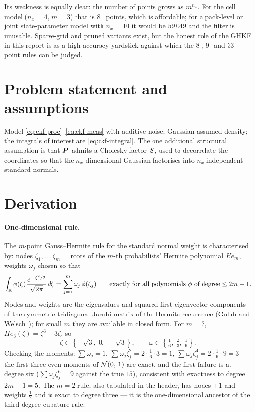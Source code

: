Its weakness is equally clear: the number of points grows as $m^{n_x}$. For the cell model
($n_x = 4$, $m = 3$) that is $81$ points, which is affordable; for a pack-level or
joint state-parameter model with $n_x = 10$ it would be $59\,049$ and the filter is unusable.
Sparse-grid and pruned variants exist, but the honest role of the GHKF in this report is as a
high-accuracy yardstick against which the $8$-, $9$- and $33$-point rules can be judged.

\section{Problem statement and assumptions}
Model \eqref{eq:ekf-proc}--\eqref{eq:ekf-meas} with additive noise; Gaussian assumed density;
the integrals of interest are \eqref{eq:ckf-integral}. The one additional structural
assumption is that $\bm{P}$ admits a Cholesky factor $\bm{S}$, used to decorrelate the coordinates
so that the $n_x$-dimensional Gaussian factorises into $n_x$ independent standard normals.

\section{Derivation}
\paragraph{One-dimensional rule.} The $m$-point Gauss--Hermite rule for the standard normal
weight is characterised by: nodes $\zeta_1,\dots,\zeta_m$ = roots of the $m$-th probabilists'
Hermite polynomial $He_m$, weights $\omega_j$ chosen so that
\begin{equation}
\int_{\mathbb{R}}\phi(\zeta)\,\frac{e^{-\zeta^2/2}}{\sqrt{2\pi}}\,d\zeta = \sum_{j=1}^m \omega_j\,\phi(\zeta_j)
\qquad\text{exactly for all polynomials } \phi \text{ of degree} \le 2m-1.
\label{eq:ghkf-1d}
\end{equation}
Nodes and weights are the eigenvalues and squared first eigenvector components of the
symmetric tridiagonal Jacobi matrix of the Hermite recurrence (Golub and
Welsch~\cite{golubwelsch1969}); for small $m$ they are available in closed form. For $m=3$,
$He_3(\zeta) = \zeta^3-3\zeta$, so
\begin{equation}
\zeta \in \left\{-\sqrt3,\;0,\;+\sqrt3\right\}, \qquad
\omega \in \left\{\tfrac16,\;\tfrac23,\;\tfrac16\right\}.
\label{eq:ghkf-m3}
\end{equation}
Checking the moments: $\sum\omega_j = 1$, $\sum\omega_j\zeta_j^2 = 2\cdot\tfrac16\cdot3 = 1$,
$\sum\omega_j\zeta_j^4 = 2\cdot\tfrac16\cdot9 = 3$ --- the first three even moments of
$\mathcal{N}\!\left(0,\,1\right)$ are exact, and the first failure is at degree six
($\sum\omega_j\zeta_j^6 = 9$ against the true $15$), consistent with exactness to degree
$2m-1=5$. The $m=2$ rule, also tabulated in the header, has nodes $\pm1$ and weights
$\tfrac12$ and is exact to degree three --- it is the one-dimensional ancestor of the
third-degree cubature rule.

